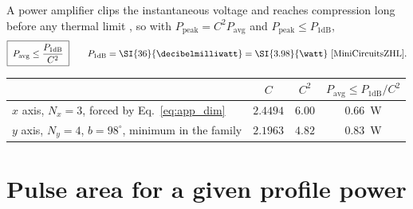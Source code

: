 A power amplifier clips the instantaneous voltage and reaches compression long
before any thermal limit \cite{Pozar2012,Cripps2006}, so with
$P_\mathrm{peak}=C^2P_\mathrm{avg}$ and
$P_\mathrm{peak}\le P_\mathrm{1dB}$,
\begin{equation}
\boxed{\;
P_\mathrm{avg}\le\frac{P_\mathrm{1dB}}{C^{2}}\;}
\qquad
P_\mathrm{1dB}=\SI{36}{\decibelmilliwatt}=\SI{3.98}{\watt}
\ \text{\cite{MiniCircuitsZHL}} .
\label{eq:app_backoff}
\end{equation}

\begin{center}
\begin{tabular}{lccc}
\hline
& $C$ & $C^2$ & $P_\mathrm{avg}\le P_\mathrm{1dB}/C^2$\\ \hline
$x$ axis, $N_x=3$, forced by Eq.~\eqref{eq:app_dim}
 & $2.4494$ & $6.00$ & \SI{0.66}{\watt}\\
$y$ axis, $N_y=4$, $b=98^\circ$, minimum in the family
 & $2.1963$ & $4.82$ & \SI{0.83}{\watt}\\ \hline
\end{tabular}
\end{center}

\section{Pulse area for a given profile power}
\label{app:pulsearea}


